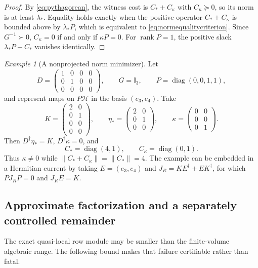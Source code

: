 \documentclass[11pt]{article}
\theoremstyle{definition}
\theoremstyle{remark}
\newtheorem{example}[theorem]{Example}
\newcommand{\rank}{\operatorname{rank}}
\newcommand{\Id}{\mathbb I}
\newcommand{\cH}{\mathcal H}
\begin{document}
\begin{proof}
By \eqref{eq:pythagorean}, the witness cost is $C_*+C_\kappa$ with $C_\kappa\succeq0$, so its norm is at least $\lambda_*$.  Equality holds exactly when the positive operator $C_*+C_\kappa$ is bounded above by $\lambda_*P$, which is equivalent to \eqref{eq:normequalitycriterion}.  Since $G^{-1}\succ0$, $C_\kappa=0$ if and only if $\kappa P=0$.  For $\rank P=1$, the positive slack $\lambda_*P-C_*$ vanishes identically.
\end{proof}

\begin{example}[A nonprojected norm minimizer]
Let
\[
 D=\begin{pmatrix}1&0&0&0\\0&1&0&0\\0&0&0&0\end{pmatrix},
 \qquad G=\Id_3,
 \qquad P=\operatorname{diag}(0,0,1,1),
\]
and represent maps on $P\cH$ in the basis $(e_3,e_4)$.  Take
\[
 K=\begin{pmatrix}2&0\\0&1\\0&0\\0&0\end{pmatrix},
 \qquad
 \eta_*=\begin{pmatrix}2&0\\0&1\\0&0\end{pmatrix},
 \qquad
 \kappa=\begin{pmatrix}0&0\\0&0\\0&1\end{pmatrix}.
\]
Then $D^\dagger\eta_*=K$, $D^\dagger\kappa=0$, and
\[
 C_*=\operatorname{diag}(4,1),
 \qquad
 C_\kappa=\operatorname{diag}(0,1).
\]
Thus $\kappa\ne0$ while $\|C_*+C_\kappa\|=\|C_*\|=4$.  The example can be embedded in a Hermitian current by taking $E=(e_3,e_4)$ and $J_R=KE^\dagger+EK^\dagger$, for which $PJ_RP=0$ and $J_RE=K$.
\end{example}

\subsection{Approximate factorization and a separately controlled remainder}

The exact quasi-local row module may be smaller than the finite-volume algebraic range.  The following bound makes that failure certifiable rather than fatal.
\end{document}

